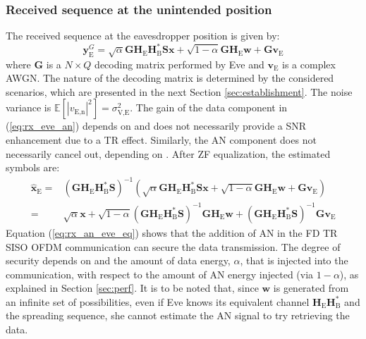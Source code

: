 \documentclass[journal,comsoc]{IEEEtran}
\newcommand{\EX}[1]{\mathbb{E} \left[#1\right]}%
\newcommand{\HE}{\textbf{H}_{\text{E}}}
\newcommand{\HB}{\textbf{H}_{\text{B}}}
\newcommand{\spread}{\textbf{S}}
\newcommand{\w}{\textbf{w}}
\newcommand{\mat}[1]{\boldsymbol{\mathrm{#1}}}
\begin{document}
\subsubsection{Received sequence at the unintended position}
The received sequence at the eavesdropper position is given by:
\begin{equation}
	\textbf{y}_{\text{E}}^G = \sqrt{\alpha}  \textbf{G} \HE \HB^* \spread\textbf{x} + \sqrt{1-\alpha} \textbf{G} \HE \w + \textbf{G}  \textbf{v}_\text{E}
	\label{eq:rx_eve_an}
\end{equation}
where $\textbf{G}$ is a $N \times Q$ decoding matrix performed by Eve and $\textbf{v}_\text{E}$ is a complex AWGN. The nature of the decoding matrix is determined by the considered scenarios, which are presented in the next Section \ref{sec:establishment}. The noise variance is $\EX{|v_{\text{E,n}}|^2} = \sigma_{\text{V,E}}^2$.  The gain of the data component in (\ref{eq:rx_eve_an}) depends on \mat{G} and does not necessarily provide a SNR enhancement due to a TR effect. Similarly, the AN component does not necessarily cancel out, depending on \mat{G}. After ZF equalization, the estimated symbols are:
\begin{equation}
	\begin{split}
		\hat{\textbf{x}}_{\text{E}} =& \left(\textbf{G} \HE \HB^* \spread \right)^{-1}
		\left( \sqrt{\alpha} \textbf{G} \HE \HB^* \spread \textbf{x} +   \sqrt{1-\alpha} \textbf{G} \HE \w  +  \textbf{G}  \textbf{v}_\text{E}  \right) \\
		=& \sqrt{\alpha}\textbf{x} + \sqrt{1-\alpha} \left(\textbf{G} \HE \HB^* \spread \right)^{-1}  \textbf{G} \HE \w + \left(\textbf{G} \HE \HB^* \spread \right)^{-1}  \textbf{G} \textbf{v}_\text{E}
	\end{split}
	\label{eq:rx_an_eve_eq}
\end{equation}
Equation (\ref{eq:rx_an_eve_eq}) shows that the addition of AN in the FD TR SISO OFDM communication can secure the data transmission. The degree of security depends on \mat{G} and the amount of data energy, $\alpha$, that is injected into the communication, with respect to the amount of AN energy injected (via $1-\alpha$), as explained in Section \ref{sec:perf}. It is to be noted that, since $\w$ is generated from an infinite set of possibilities, even if Eve knows its equivalent channel $\HE\HB^*$ and the spreading sequence, she cannot estimate the AN signal  to try retrieving the data. 
\end{document}
